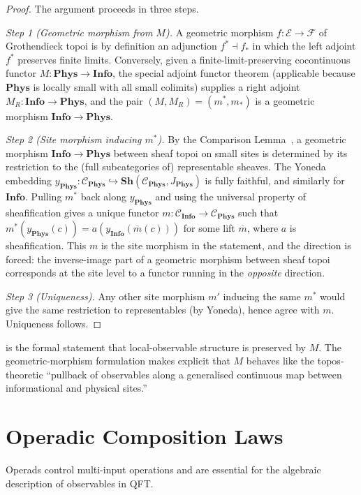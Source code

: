 \documentclass[12pt]{article}
\theoremstyle{definition}
\theoremstyle{remark}
\newcommand{\C}{\mathcal{C}}
\newcommand{\E}{\mathcal{E}}
\newcommand{\Phys}{\mathbf{Phys}}
\newcommand{\Info}{\mathbf{Info}}
\begin{document}
\begin{proof}
The argument proceeds in three steps.

\smallskip\noindent
\emph{Step 1 (Geometric morphism from $M$).}\;
A geometric morphism $f : \E \to \mathcal{F}$ of Grothendieck topoi is by definition an adjunction $f^* \dashv f_*$ in which the left adjoint $f^*$ preserves finite limits. Conversely, given a finite-limit-preserving cocontinuous functor $M : \Phys \to \Info$, the special adjoint functor theorem (applicable because $\Phys$ is locally small with all small colimits) supplies a right adjoint $M_R : \Info \to \Phys$, and the pair $(M, M_R) = (m^*, m_*)$ is a geometric morphism $\Info \to \Phys$.

\emph{Step 2 (Site morphism inducing $m^*$).} By the Comparison Lemma~\cite{maclane1998}, a geometric morphism $\Info \to \Phys$ between sheaf topoi on small sites is determined by its restriction to the (full subcategories of) representable sheaves. The Yoneda embedding $y_\Phys : \C_\Phys \hookrightarrow \mathbf{Sh}(\C_\Phys, J_\Phys)$ is fully faithful, and similarly for $\Info$. Pulling $m^*$ back along $y_\Phys$ and using the universal property of sheafification gives a unique functor $m : \C_\Info \to \C_\Phys$ such that $m^* (y_\Phys(c)) = a(y_\Info(\overline{m}(c)))$ for some lift $\overline{m}$, where $a$ is sheafification. This $m$ is the site morphism in the statement, and the direction is forced: the inverse-image part of a geometric morphism between sheaf topoi corresponds at the site level to a functor running in the \emph{opposite} direction.

\emph{Step 3 (Uniqueness).} Any other site morphism $m'$ inducing the same $m^*$ would give the same restriction to representables (by Yoneda), hence agree with $m$. Uniqueness follows.
\end{proof}

 is the formal statement that local-observable structure is preserved by $M$. The geometric-morphism formulation makes explicit that $M$ behaves like the topos-theoretic ``pullback of observables along a generalised continuous map between informational and physical sites.''

\section{Operadic Composition Laws}
\label{sec:operads}

Operads control multi-input operations and are essential for the algebraic description of observables in QFT.
\end{document}
